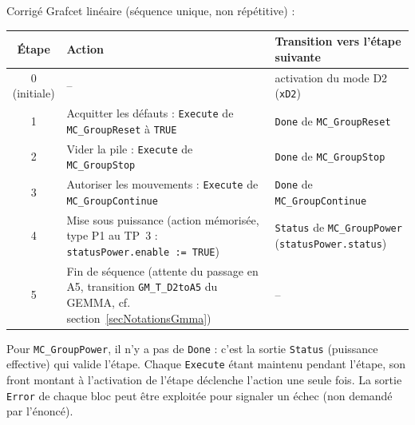 \begin{UPSTIactivite}

\begin{UPSTIcorrectionP}{Corrigé}
Grafcet linéaire (séquence unique, non répétitive) :
\begin{center}
\begin{tabular}{|c|p{6.2cm}|p{5.2cm}|}
\hline
\textbf{Étape} & \textbf{Action} & \textbf{Transition vers l'étape suivante} \\
\hline
0 (initiale) & -- & activation du mode D2 (\texttt{xD2}) \\
\hline
1 & Acquitter les défauts : \texttt{Execute} de \texttt{MC\_GroupReset} à
\texttt{TRUE} & \texttt{Done} de \texttt{MC\_GroupReset} \\
\hline
2 & Vider la pile : \texttt{Execute} de \texttt{MC\_GroupStop} &
\texttt{Done} de \texttt{MC\_GroupStop} \\
\hline
3 & Autoriser les mouvements : \texttt{Execute} de
\texttt{MC\_GroupContinue} & \texttt{Done} de \texttt{MC\_GroupContinue} \\
\hline
4 & Mise sous puissance (action mémorisée, type P1 au TP~3 :
\texttt{statusPower.enable := TRUE}) & \texttt{Status} de
\texttt{MC\_GroupPower} (\texttt{statusPower.status}) \\
\hline
5 & Fin de séquence (attente du passage en A5, transition
\texttt{GM\_T\_D2toA5} du GEMMA, cf. section~\ref{secNotationsGmma}) & -- \\
\hline
\end{tabular}
\end{center}
Pour \texttt{MC\_GroupPower}, il n'y a pas de \texttt{Done} : c'est la
sortie \texttt{Status} (puissance effective) qui valide l'étape. Chaque
\texttt{Execute} étant maintenu pendant l'étape, son front montant à
l'activation de l'étape déclenche l'action une seule fois. La sortie
\texttt{Error} de chaque bloc peut être exploitée pour signaler un échec
(non demandé par l'énoncé).
\end{UPSTIcorrectionP}
\end{UPSTIactivite}

